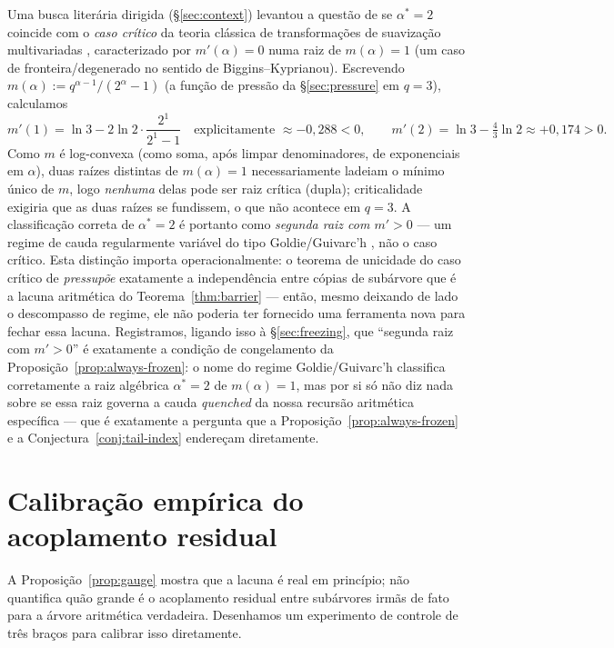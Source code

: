 \documentclass[11pt]{article}
\theoremstyle{definition}
\theoremstyle{remark}
\begin{document}
Uma busca literária dirigida (\S\ref{sec:context}) levantou a questão
de se $\alpha^\ast=2$ coincide com o \emph{caso crítico} da teoria
clássica de transformações de suavização multivariadas
\cite{KoleskoMentemeier2015}, caracterizado por $m'(\alpha)=0$ numa
raiz de $m(\alpha)=1$ (um caso de fronteira/degenerado no sentido de
Biggins--Kyprianou). Escrevendo $m(\alpha):=q^{\alpha-1}/(2^\alpha-1)$
(a função de pressão da \S\ref{sec:pressure} em $q=3$), calculamos
\[
  m'(1) = \ln 3 - 2\ln 2\cdot\frac{2^1}{2^1-1}
    \quad\text{explicitamente } \approx -0{,}288 < 0, \qquad
  m'(2) = \ln 3 - \tfrac{4}{3}\ln 2 \approx +0{,}174 > 0.
\]
Como $m$ é log-convexa (como soma, após limpar denominadores, de
exponenciais em $\alpha$), duas raízes distintas de $m(\alpha)=1$
necessariamente ladeiam o mínimo único de $m$, logo \emph{nenhuma}
delas pode ser raiz crítica (dupla); criticalidade exigiria que as duas
raízes se fundissem, o que não acontece em $q=3$. A classificação
correta de $\alpha^\ast=2$ é portanto como \emph{segunda raiz com
$m'>0$} --- um regime de cauda regularmente variável do tipo
Goldie/Guivarc'h \cite{Goldie1991,BuraczewskiDamekMikosch2016}, não o
caso crítico. Esta distinção importa operacionalmente: o teorema de
unicidade do caso crítico de \cite{KoleskoMentemeier2015}
\emph{pressupõe} exatamente a independência entre cópias de subárvore
que é a lacuna aritmética do Teorema~\ref{thm:barrier} --- então, mesmo
deixando de lado o descompasso de regime, ele não poderia ter
fornecido uma ferramenta nova para fechar essa lacuna. Registramos,
ligando isso à \S\ref{sec:freezing}, que ``segunda raiz com $m'>0$'' é
exatamente a condição de congelamento da
Proposição~\ref{prop:always-frozen}: o nome do regime
Goldie/Guivarc'h classifica corretamente a raiz algébrica
$\alpha^\ast=2$ de $m(\alpha)=1$, mas por si só não diz nada sobre se
essa raiz governa a cauda \emph{quenched} da nossa recursão aritmética
específica --- que é exatamente a pergunta que a
Proposição~\ref{prop:always-frozen} e a Conjectura~\ref{conj:tail-index}
endereçam diretamente.

\section{Calibração empírica do acoplamento residual}
\label{sec:calibration}

A Proposição~\ref{prop:gauge} mostra que a lacuna é real em princípio;
não quantifica quão grande é o acoplamento residual entre subárvores
irmãs de fato para a árvore aritmética verdadeira. Desenhamos um
experimento de controle de três braços para calibrar isso diretamente.
\end{document}
